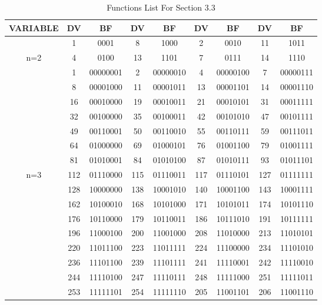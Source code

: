 \documentclass{article}
\begin{document}
\begin{table}[th]
\centering
\caption{Functions List For Section 3.3}
{
       \resizebox{9cm}{!}
       {
\begin{tabular}{|c|c|c|c|c|c|c|c|c|}
\hline
\textbf{VARIABLE} & \textbf{DV} & \textbf{BF} & \textbf{DV} & \textbf{BF} & \textbf{DV} & \textbf{BF} & \textbf{DV} & \textbf{BF}\\
\hline 
& 1 & 0001 & 8 & 1000 
& 2 & 0010 & 11 & 1011 \\
n=2 & 4 & 0100 & 13 & 1101 
& 7 & 0111 & 14 & 1110 \\
\hline
& 1 & 00000001 & 2 & 00000010 
& 4 & 00000100 & 7 & 00000111 \\
& 8 & 00001000 & 11 & 00001011 
& 13 & 00001101 & 14 & 00001110 \\
& 16 & 00010000 & 19 & 00010011 
& 21 & 00010101 & 31 & 00011111 \\
& 32 & 00100000 & 35 & 00100011 
& 42 & 00101010 & 47 & 00101111 \\
& 49 & 00110001 & 50 & 00110010 
& 55 & 00110111 & 59 & 00111011 \\
& 64 & 01000000 & 69 & 01000101  
& 76 & 01001100 & 79 & 01001111 \\
& 81 & 01010001 & 84 & 01010100 
& 87 & 01010111 & 93 & 01011101 \\
n=3 & 112 & 01110000 & 115 & 01110011 
& 117 & 01110101 & 127 & 01111111 \\
& 128 & 10000000 & 138 & 10001010 
& 140 & 10001100 & 143 & 10001111 \\
& 162 & 10100010 & 168 & 10101000 
& 171 & 10101011 & 174 & 10101110 \\
& 176 & 10110000 & 179 & 10110011 
& 186 & 10111010 & 191 & 10111111 \\
& 196 & 11000100 & 200 & 11001000 
& 208 & 11010000 & 213 & 11010101 \\
& 220 & 11011100 & 223 & 11011111 
& 224 & 11100000 & 234 & 11101010 \\
& 236 & 11101100 & 239 & 11101111 
& 241 & 11110001 & 242 & 11110010 \\
& 244 & 11110100 & 247 & 11110111 
& 248 & 11111000 & 251 & 11111011 \\
& 253 & 11111101 & 254 & 11111110 
& 205 & 11001101 & 206 & 11001110 \\
\hline
\end{tabular}}
}
\end{table}
\end{document}
